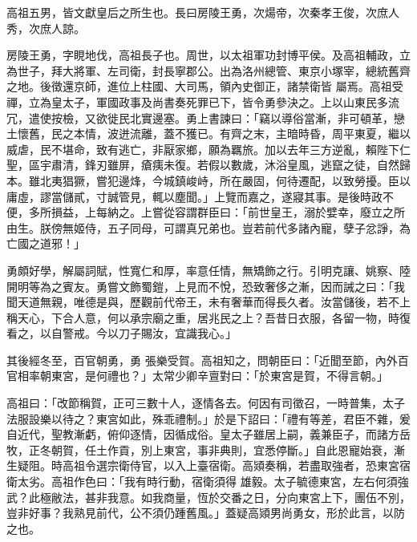 
\begin{pinyinscope}

 高祖五男，皆文獻皇后之所生也。長曰房陵王勇，次煬帝，次秦孝王俊，次庶人秀，次庶人諒。



 房陵王勇，字睍地伐，高祖長子也。周世，以太祖軍功封博平侯。及高祖輔政，立為世子，拜大將軍、左司衛，封長寧郡公。出為洛州總管、東京小塚宰，總統舊齊之地。後徵還京師，進位上柱國、大司馬，領內史御正，諸禁衛皆
 屬焉。高祖受禪，立為皇太子，軍國政事及尚書奏死罪已下，皆令勇參決之。上以山東民多流冗，遣使按檢，又欲徙民北實邊塞。勇上書諫曰：「竊以導俗當漸，非可頓革，戀土懷舊，民之本情，波迸流離，蓋不獲已。有齊之末，主暗時昏，周平東夏，繼以威虐，民不堪命，致有逃亡，非厭家鄉，願為羈旅。加以去年三方逆亂，賴陛下仁聖，區宇肅清，鋒刃雖屏，瘡痍未復。若假以數歲，沐浴皇風，逃竄之徒，自然歸本。雖北夷猖獗，嘗犯邊烽，今城鎮峻峙，所在嚴固，何待遷配，以致勞擾。臣以庸虛，謬當儲貳，寸誠管見，輒以塵聞。」上覽而嘉之，遂寢其事。是後時政不
 便，多所損益，上每納之。上嘗從容謂群臣曰：「前世皇王，溺於嬖幸，廢立之所由生。朕傍無姬侍，五子同母，可謂真兄弟也。豈若前代多諸內寵，孽子忿諍，為亡國之道邪！」



 勇頗好學，解屬詞賦，性寬仁和厚，率意任情，無矯飾之行。引明克讓、姚察、陸開明等為之賓友。勇嘗文飾蜀鎧，上見而不悅，恐致奢侈之漸，因而誡之曰：「我聞天道無親，唯德是與，歷觀前代帝王，未有奢華而得長久者。汝當儲後，若不上稱天心，下合人意，何以承宗廟之重，居兆民之上？吾昔日衣服，各留一物，時復看之，以自警戒。今以刀子賜汝，宜識我心。」



 其後經冬至，百官朝勇，勇
 張樂受賀。高祖知之，問朝臣曰：「近聞至節，內外百官相率朝東宮，是何禮也？」太常少卿辛亶對曰：「於東宮是賀，不得言朝。」



 高祖曰：「改節稱賀，正可三數十人，逐情各去。何因有司徵召，一時普集，太子法服設樂以待之？東宮如此，殊乖禮制。」於是下詔曰：「禮有等差，君臣不雜，爰自近代，聖教漸虧，俯仰逐情，因循成俗。皇太子雖居上嗣，義兼臣子，而諸方岳牧，正冬朝賀，任土作貢，別上東宮，事非典則，宜悉停斷。」自此恩寵始衰，漸生疑阻。時高祖令選宗衛侍官，以入上臺宿衛。高熲奏稱，若盡取強者，恐東宮宿衛太劣。高祖作色曰：「我有時行動，宿衛須得
 雄毅。太子毓德東宮，左右何須強武？此極敝法，甚非我意。如我商量，恆於交番之日，分向東宮上下，團伍不別，豈非好事？我熟見前代，公不須仍踵舊風。」蓋疑高熲男尚勇女，形於此言，以防之也。




\end{pinyinscope}

